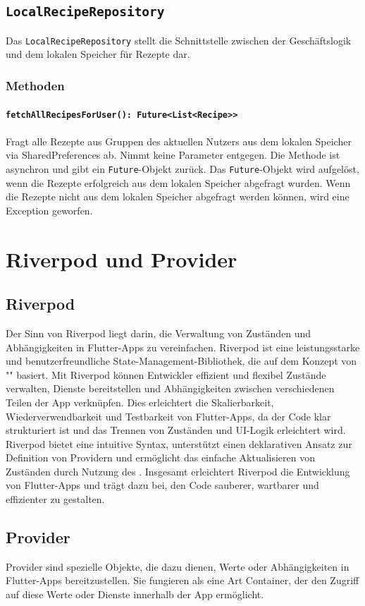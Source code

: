 \documentclass{entwurfsheft}
\begin{document}
\begin{sloppypar}
\subsection{\texttt{LocalRecipeRepository}}
\label{sec:localRecipeRepository}
Das \texttt{LocalRecipeRepository} stellt die Schnittstelle zwischen der Geschäftslogik und dem lokalen Speicher für Rezepte dar.
\subsubsection*{Methoden}
\paragraph{\texttt{fetchAllRecipesForUser(): Future<List<Recipe>>}}
Fragt alle Rezepte aus Gruppen des aktuellen Nutzers aus dem lokalen Speicher via \Gls{SharedPreferences} ab. Nimmt keine Parameter entgegen. Die Methode ist asynchron und gibt ein \texttt{Future}-Objekt zurück. Das \texttt{Future}-Objekt wird aufgelöst, wenn die Rezepte erfolgreich aus dem lokalen Speicher abgefragt wurden. Wenn die Rezepte nicht aus dem lokalen Speicher abgefragt werden können, wird eine Exception geworfen.
\newpage
\section{Riverpod und Provider}
\label{sec:riverpod}
\subsection{Riverpod}
Der Sinn von Riverpod liegt darin, die Verwaltung von Zuständen und Abhängigkeiten in Flutter-Apps zu vereinfachen. Riverpod ist eine leistungsstarke und benutzerfreundliche State-Management-Bibliothek, die auf dem Konzept von "" basiert. Mit Riverpod können Entwickler effizient und flexibel Zustände verwalten, Dienste bereitstellen und Abhängigkeiten zwischen verschiedenen Teilen der App verknüpfen. Dies erleichtert die Skalierbarkeit, Wiederverwendbarkeit und Testbarkeit von Flutter-Apps, da der Code klar strukturiert ist und das Trennen von Zuständen und UI-Logik erleichtert wird. Riverpod bietet eine intuitive Syntax, unterstützt einen deklarativen Ansatz zur Definition von Providern und ermöglicht das einfache Aktualisieren von Zuständen durch Nutzung des . Insgesamt erleichtert Riverpod die Entwicklung von Flutter-Apps und trägt dazu bei, den Code sauberer, wartbarer und effizienter zu gestalten.
\subsection{Provider}\label{sec:provider}
Provider sind spezielle Objekte, die dazu dienen, Werte oder Abhängigkeiten in Flutter-Apps bereitzustellen. Sie fungieren als eine Art Container, der den Zugriff auf diese Werte oder Dienste innerhalb der App ermöglicht.


\end{sloppypar}
\end{document}
